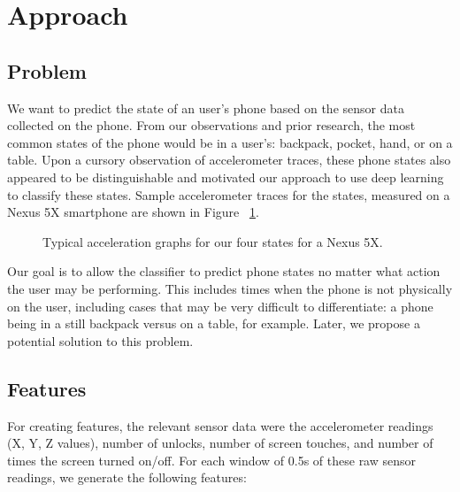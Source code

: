 \section{Approach}

\subsection{Problem}
We want to predict the state of an user's phone based on the sensor data collected on the phone. 
From our observations and prior research, the most common states of the phone would be in a user's: backpack, pocket, hand, or on a table.
Upon a cursory observation of accelerometer traces, these phone states also appeared to be distinguishable and motivated
our approach to use deep learning to classify these states.
Sample accelerometer traces for the states, measured on a Nexus 5X
smartphone are shown in Figure ~\ref{fig:AccelDiffStates}.

\begin{figure}[h]
\begin{center}
 \scalebox{0.1}{}
  \scalebox{0.1}{}
  \scalebox{0.1}{}
  \scalebox{0.1}{}
  \caption{Typical acceleration graphs for our four states for a Nexus 5X.}
  \label{fig:AccelDiffStates}
\end{center}
\end{figure}


Our goal is to allow the classifier to predict phone states no matter what action the user may be performing.
This includes times when the phone is not physically on the user, including cases that may be very difficult to differentiate: a phone being in a still backpack versus on a table, for example.
Later, we propose a potential solution to this problem. 


\subsection{Features}
For creating features, the relevant sensor data were the accelerometer readings (X, Y, Z values), number of unlocks, number of screen touches, and number of times the screen turned on/off. 
For each window of 0.5s of these raw sensor readings, we generate the following features:

